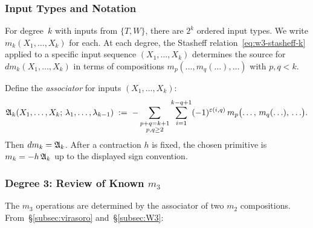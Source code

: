 \subsubsection{Input Types and Notation}

For degree~$k$ with inputs from $\{T, W\}$, there are $2^k$ ordered
input types. We write $m_k(X_1, \ldots, X_k)$ for each. At each
degree, the Stasheff relation~\eqref{eq:w3-stasheff-k} applied to a
specific input sequence $(X_1, \ldots, X_k)$ determines the source for
\(d m_k(X_1,\ldots,X_k)\) in terms of compositions
$m_p(\ldots, m_q(\ldots), \ldots)$ with $p, q < k$.

Define the \emph{associator} for inputs $(X_1, \ldots, X_k)$:
\begin{equation}
\label{eq:w3-associator-def}
\mathfrak{A}_k(X_1, \ldots, X_k;\, \lambda_1, \ldots, \lambda_{k-1})
\;:=\;
-\sum_{\substack{p+q = k+1 \\ p,q \ge 2}}
\sum_{i=1}^{k-q+1}
(-1)^{\varepsilon(i,q)}\,
m_p\bigl(\ldots,\, m_q(\ldots),\, \ldots\bigr).
\end{equation}
Then \(d m_k=\mathfrak{A}_k\). After a contraction \(h\) is fixed, the
chosen primitive is \(m_k=-h\,\mathfrak{A}_k\) up to the displayed sign
convention.

\subsubsection{Degree 3: Review of Known $m_3$}

The $m_3$ operations are determined by the associator of two $m_2$
compositions. From~\S\ref{subsec:virasoro} and~\S\ref{subsec:W3}:

